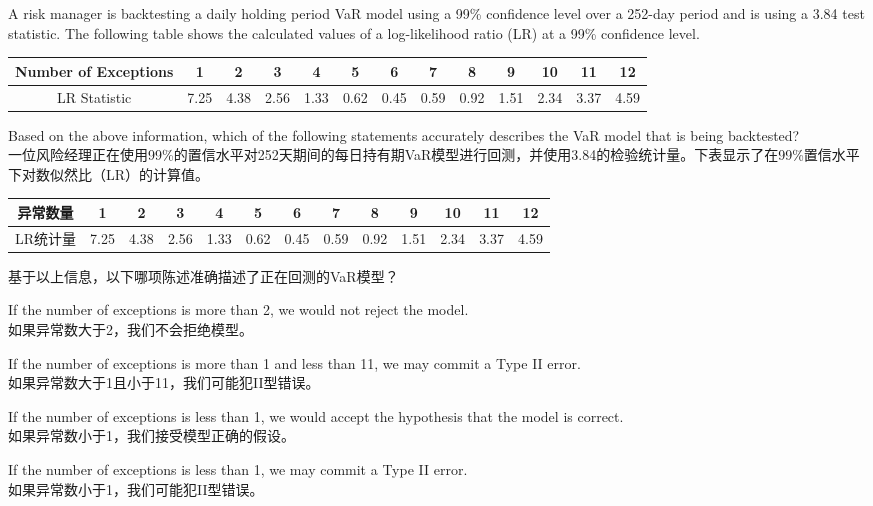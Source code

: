 \documentclass{article}
\newcounter{question} %
\begin{document}
\begin{question}
    A risk manager is backtesting a daily holding period VaR model using a 99\% confidence level over a 252-day period and is using a 3.84 test statistic. The following table shows the calculated values of a log-likelihood ratio (LR) at a 99\% confidence level.

    \begin{table}[H]
        \centering
        \begin{tabular}{|c|cccccccccccc|}
            \hline
            Number of Exceptions& 1 & 2 & 3 & 4 & 5 & 6 & 7 & 8 & 9 & 10 & 11 & 12 \\
            \hline
            LR Statistic & 7.25 & 4.38 & 2.56 & 1.33 & 0.62 & 0.45 & 0.59 & 0.92 & 1.51 & 2.34 & 3.37 & 4.59 \\
            \hline
        \end{tabular}
    \end{table}

    Based on the above information, which of the following statements accurately describes the VaR model that is being backtested?
    \\    一位风险经理正在使用99\%的置信水平对252天期间的每日持有期VaR模型进行回测，并使用3.84的检验统计量。下表显示了在99\%置信水平下对数似然比（LR）的计算值。

    \begin{table}[H]
        \centering
        \begin{tabular}{|c|cccccccccccc|}
            \hline
            异常数量& 1 & 2 & 3 & 4 & 5 & 6 & 7 & 8 & 9 & 10 & 11 & 12 \\
            \hline
            LR统计量 & 7.25 & 4.38 & 2.56 & 1.33 & 0.62 & 0.45 & 0.59 & 0.92 & 1.51 & 2.34 & 3.37 & 4.59 \\
            \hline
        \end{tabular}
    \end{table}

    基于以上信息，以下哪项陈述准确描述了正在回测的VaR模型？
\end{question}

\begin{choices}
    \item If the number of exceptions is more than 2, we would not reject the model.\\
        如果异常数大于2，我们不会拒绝模型。
    \item If the number of exceptions is more than 1 and less than 11, we may commit a Type II error.\\
        如果异常数大于1且小于11，我们可能犯II型错误。
    \item If the number of exceptions is less than 1, we would accept the hypothesis that the model is correct.\\
        如果异常数小于1，我们接受模型正确的假设。
    \item If the number of exceptions is less than 1, we may commit a Type II error.\\
        如果异常数小于1，我们可能犯II型错误。
\end{choices}
\end{document}
